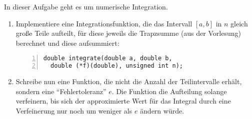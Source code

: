 \begin{aufg}
In dieser Aufgabe geht es um numerische Integration.
\begin{enumerate}
\item Implementiere eine Integrationsfunktion, die das Intervall $[a, b]$ in $n$ gleich große Teile aufteilt, für diese jeweils die Trapzsumme (aus der Vorlesung) berechnet und diese aufsummiert:

\begin{codelisting}
\begin{lstlisting}[numbers=left,numberstyle=\tiny,frame=tlrb]
double integrate(double a, double b, 
  double (*f)(double), unsigned int n); 
\end{lstlisting}
\end{codelisting}

\item Schreibe nun eine Funktion, die nicht die Anzahl der Teilintervalle erhält, sondern eine ``Fehlertoleranz'' $e$. Die Funktion die Aufteilung solange verfeinern, bis sich der approximierte Wert für das Integral durch eine Verfeinerung nur noch um weniger als $e$ ändern würde. 
\end{enumerate}
\end{aufg}
